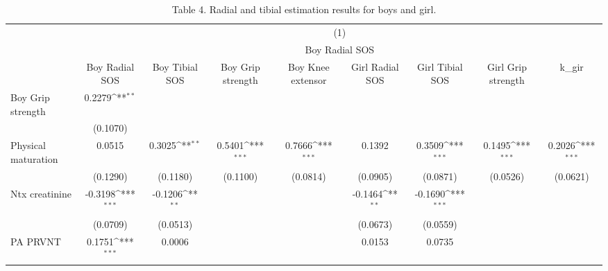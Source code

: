 \begin{table}[htbp]\centering
\def\sym#1{\ifmmode^{#1}\else\(^{#1}\)\fi}
\caption{Table 4. Radial and tibial estimation results for boys and girl.}
\begin{tabular}{l*{8}{c}}
\hline\hline
                              &\multicolumn{8}{c}{(1)}                                                                                                                                        \\
                              &\multicolumn{8}{c}{Boy Radial SOS}                                                                                                                             \\
                              &Boy Radial SOS         &Boy Tibial SOS         &Boy Grip strength         &Boy Knee extensor         &Girl Radial SOS         &Girl Tibial SOS         &Girl Grip strength         &     k\_gir         \\
\hline
Boy Grip strength             &    0.2279\sym{**} &                   &                   &                   &                   &                   &                   &                   \\
                              &  (0.1070)         &                   &                   &                   &                   &                   &                   &                   \\
[1em]
Physical maturation           &    0.0515         &    0.3025\sym{**} &    0.5401\sym{***}&    0.7666\sym{***}&    0.1392         &    0.3509\sym{***}&    0.1495\sym{***}&    0.2026\sym{***}\\
                              &  (0.1290)         &  (0.1180)         &  (0.1100)         &  (0.0814)         &  (0.0905)         &  (0.0871)         &  (0.0526)         &  (0.0621)         \\
[1em]
Ntx creatinine                &   -0.3198\sym{***}&   -0.1206\sym{**} &                   &                   &   -0.1464\sym{**} &   -0.1690\sym{***}&                   &                   \\
                              &  (0.0709)         &  (0.0513)         &                   &                   &  (0.0673)         &  (0.0559)         &                   &                   \\
[1em]
PA PRVNT                      &    0.1751\sym{***}&    0.0006         &                   &                   &    0.0153         &    0.0735         &                   &                   \\

\end{tabular}
\end{table}
